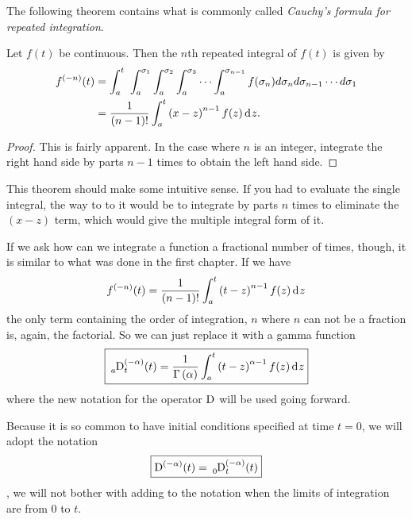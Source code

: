     The following theorem contains what is commonly called \emph{Cauchy's formula for repeated integration}.

    \begin{theorem}
      Let $f(t)$ be continuous. Then the $n$th repeated integral of $f(t)$ is given by
      \begin{equation}
	\begin{aligned}
	  f^{(-n)}(t) &= \int_a^{t}  \ \int_a^{\sigma_1}  \int_a^{\sigma_2}  \int_a^{\sigma_3} \cdots \int_a^{\sigma_{n-1}} f(\sigma_n) d \sigma_n d \sigma_{n-1} \cdots d \sigma_1  \\
	  &= \frac{1}{\left( n - 1 \right)!} \int_a^t \left( x - z \right)^{n-1} f(z) \d z.
	\end{aligned}
	\label{eq:cauchy}
      \end{equation}
      \label{th:cauchy}
    \end{theorem}
    \begin{proof}
      This is fairly apparent. In the case where $n$ is an integer, integrate the right hand side by parts $n-1$ times to obtain the left hand side. 
    \end{proof}

    This theorem should make some intuitive sense. If you had to evaluate the single integral, the way to to it would be to integrate by parts $n$ times to eliminate the $(x - z)$ term, which would give the multiple integral form of it.

    If we ask how can we integrate a function a fractional number of times, though, it is similar to what was done in the first chapter. If we have
    \begin{equation*}
      f^{(-n)}(t) = \frac{1}{\left( n - 1 \right)!} \int_a^t \left( t - z \right)^{n-1} f(z) \operatorname{d}\hspace*{-1pt} z
    \end{equation*}
    the only term containing the order of integration, $n$ where $n$ can not be a fraction is, again, the factorial. So we can just replace it with a gamma function 
    \begin{equation}
      \boxed{ \tensor*[_a]{\D}{^{(-\alpha)}_t}(t) = \frac{1}{\Gamma \left( \alpha \right)} \int_a^t \left( t - z \right)^{\alpha-1} f(z) \d z }
      \label{eq:fracint}
    \end{equation}
    where the new notation for the operator $\operatorname{D}$ will be used going forward.

    Because it is so common to have initial conditions specified at time $t=0$, we will adopt the notation 
    \begin{equation*}
      \boxed{
	\tensor*[]{\D}{^{(-\alpha)}}(t) =   \tensor*[_0]{\D}{^{(-\alpha)}_t}(t) 
      } 
    \end{equation*}
    \ie, we will not bother with adding to the notation when the limits of integration are from $0$ to $t$. 

